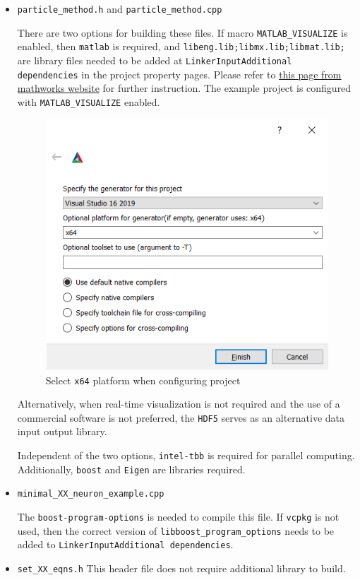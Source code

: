 \documentclass[10pt]{article} %
\begin{document}
\begin{itemize}
\item
\texttt{particle\_method.h} and \texttt{particle\_method.cpp}

There are two options for building these files. If macro \texttt{MATLAB\_VISUALIZE} is enabled, then \texttt{matlab} is required, and \texttt{libeng.lib;libmx.lib;libmat.lib;} are library files needed to be added at \texttt{Linker\textrightarrow Input\textrightarrow Additional dependencies} in the project property pages. Please refer to \href{www.mathworks.com/matlabcentral/answers/406574-how-can-i-compile-a-c-program-that-uses-matlab-engine-c-api-in-visual-studio-2017}{this page from mathworks website} for further instruction. The example project is configured with \texttt{MATLAB\_VISUALIZE} enabled.
\begin{figure}[H]
\includegraphics[width=0.5 \textwidth]{cmake_step1}
\caption{Select \texttt{x64} platform when configuring project}
\end{figure}
Alternatively, when real-time visualization is not required and the use of a commercial software is not preferred, the \texttt{HDF5} serves as an alternative data input output library. 

Independent of the two options, \texttt{intel-tbb} is required for parallel computing. Additionally, \texttt{boost} and \texttt{Eigen} are libraries required. 

\item
\texttt{minimal\_XX\_neuron\_example.cpp}

The \texttt{boost-program-options} is needed to compile this file. If \texttt{vcpkg} is not used, then the correct version of \texttt{libboost\_program\_options} needs to be added to \texttt{Linker\textrightarrow Input\textrightarrow Additional dependencies}.
\item
\texttt{set\_XX\_eqns.h}
This header file does not require additional library to build.
\end{itemize}
\end{document}
